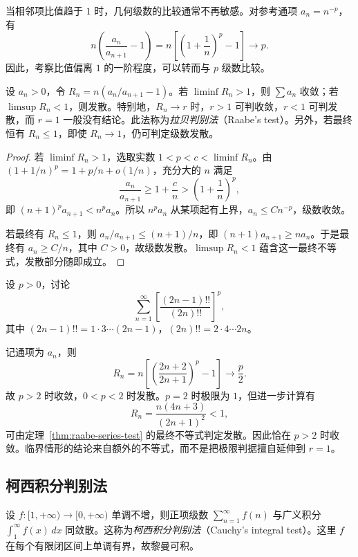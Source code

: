 当相邻项比值趋于 $1$ 时，几何级数的比较通常不再敏感。对参考通项 $a_n=n^{-p}$，有
\[
    n\left(\frac{a_n}{a_{n+1}}-1\right)
    =n\left[\left(1+\frac1n\right)^p-1\right]\longrightarrow p.
\]
因此，考察比值偏离 $1$ 的一阶程度，可以转而与 $p$ 级数比较。

\begin{theorem}[拉贝判别法]
\label{thm:raabe-series-test}
设 $a_n>0$，令 $R_n=n(a_n/a_{n+1}-1)$。若 $\liminf R_n>1$，则 $\sum a_n$ 收敛；若 $\limsup R_n<1$，则发散。特别地，$R_n\to r$ 时，$r>1$ 可判收敛，$r<1$ 可判发散，而 $r=1$ 一般没有结论。此法称为\emph{拉贝判别法}（Raabe's test）。另外，若最终恒有 $R_n\leq1$，即使 $R_n\to1$，仍可判定级数发散。
\end{theorem}

\begin{proof}
若 $\liminf R_n>1$，选取实数 $1<p<c<\liminf R_n$。由 $(1+1/n)^p=1+p/n+o(1/n)$，充分大的 $n$ 满足
\[
    \frac{a_n}{a_{n+1}}\geq1+\frac cn
      >\left(1+\frac1n\right)^p,
\]
即 $(n+1)^pa_{n+1}<n^pa_n$。所以 $n^pa_n$ 从某项起有上界，$a_n\leq Cn^{-p}$，级数收敛。

若最终有 $R_n\leq1$，则 $a_n/a_{n+1}\leq(n+1)/n$，即 $(n+1)a_{n+1}\geq na_n$。于是最终有 $a_n\geq C/n$，其中 $C>0$，故级数发散。$\limsup R_n<1$ 蕴含这一最终不等式，发散部分随即成立。
\end{proof}

\begin{example}
\label{ex:raabe-double-factorial-series}
设 $p>0$，讨论
\[
    \sum_{n=1}^{\infty}\left[\frac{(2n-1)!!}{(2n)!!}\right]^p,
\]
其中 $(2n-1)!!=1\cdot3\cdots(2n-1)$，$(2n)!!=2\cdot4\cdots2n$。
\end{example}

\begin{solve}
记通项为 $a_n$，则
\[
    R_n=n\left[\left(\frac{2n+2}{2n+1}\right)^p-1\right]
        \longrightarrow\frac p2.
\]
故 $p>2$ 时收敛，$0<p<2$ 时发散。$p=2$ 时极限为 $1$，但进一步计算有
\[
    R_n=\frac{n(4n+3)}{(2n+1)^2}<1,
\]
可由定理~\ref{thm:raabe-series-test} 的最终不等式判定发散。因此恰在 $p>2$ 时收敛。临界情形的结论来自额外的不等式，而不是把极限判据擅自延伸到 $r=1$。
\end{solve}

\subsection{柯西积分判别法}
\label{subsec:cauchy-integral-test}

\begin{theorem}[柯西积分判别法]
\label{thm:cauchy-integral-test-for-series}
设 $f:[1,+\infty)\to[0,+\infty)$ 单调不增，则正项级数 $\sum_{n=1}^{\infty}f(n)$ 与广义积分 $\int_1^{\infty}f(x)\,dx$ 同敛散。这称为\emph{柯西积分判别法}（Cauchy's integral test）。这里 $f$ 在每个有限闭区间上单调有界，故黎曼可积。
\end{theorem}

